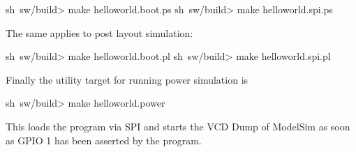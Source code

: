 \begin{shellenv}
sh~sw/build> make helloworld.boot.ps
sh~sw/build> make helloworld.spi.ps
\end{shellenv}

The same applies to post layout simulation:

\begin{shellenv}
sh~sw/build> make helloworld.boot.pl
sh~sw/build> make helloworld.spi.pl
\end{shellenv}

Finally the utility target for running power simulation is

\begin{shellenv}
sh~sw/build> make helloworld.power
\end{shellenv}

This loads the program via SPI and starts the VCD Dump of ModelSim as soon as GPIO 1 has been asserted by the program.

